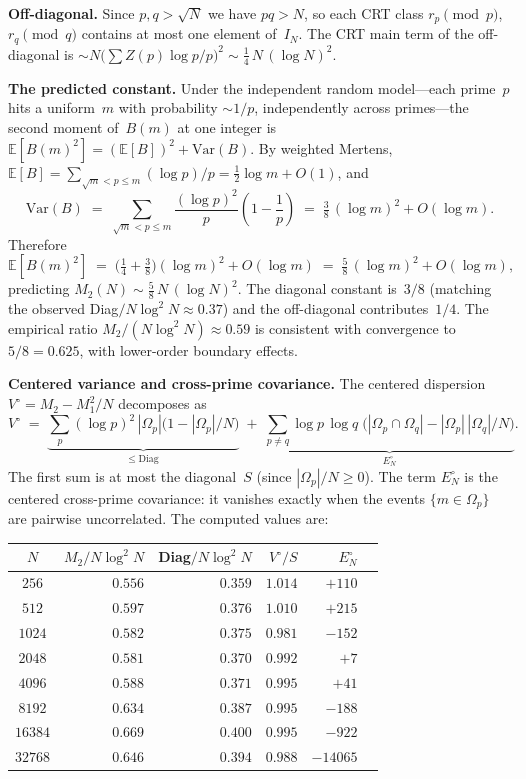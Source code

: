 \documentclass[11pt]{article}
\theoremstyle{definition}
\theoremstyle{remark}
\begin{document}
\textbf{Off-diagonal.}
Since $p, q > \sqrt{N}$ we have $pq > N$,
so each CRT class $r_p \pmod{p}$,
$r_q \pmod{q}$ contains at most one element
of~$I_N$.
The CRT main term of the off-diagonal is
$\sim N\bigl(\sum Z(p)\log p/p\bigr)^2
\sim \frac{1}{4}\,N\,(\log N)^2$.

\textbf{The predicted constant.}
Under the independent random model---each prime~$p$
hits a uniform~$m$ with probability $\sim 1/p$, independently
across primes---the second moment of~$B(m)$ at one
integer is $\mathbb{E}[B(m)^2] = (\mathbb{E}[B])^2
+ \mathrm{Var}(B)$.
By weighted Mertens,
$\mathbb{E}[B] = \sum_{\sqrt{m} < p \le m} (\log p)/p
= \frac{1}{2}\log m + O(1)$,
and
\[
  \mathrm{Var}(B) \;=\;
  \sum_{\sqrt{m} < p \le m}
  \frac{(\log p)^2}{p}\!\left(1 - \frac{1}{p}\right)
  \;=\; \tfrac{3}{8}\,(\log m)^2 + O(\log m).
\]
Therefore
\begin{equation}\label{eq:five-eighths}
  \mathbb{E}[B(m)^2] \;=\;
  \bigl(\tfrac{1}{4} + \tfrac{3}{8}\bigr)(\log m)^2
  + O(\log m)
  \;=\; \tfrac{5}{8}\,(\log m)^2 + O(\log m),
\end{equation}
predicting $M_2(N) \sim \frac{5}{8}\,N\,(\log N)^2$.
The diagonal constant is~$3/8$
(matching the observed Diag$/N\log^2 N \approx 0.37$)
and the off-diagonal contributes~$1/4$.
The empirical ratio $M_2/(N\log^2 N) \approx 0.59$
is consistent with convergence to~$5/8 = 0.625$,
with lower-order boundary effects.

\textbf{Centered variance and cross-prime covariance.}
The centered dispersion~$V^\circ = M_2 - M_1^2/N$
decomposes as
\begin{equation}\label{eq:variance-decomp}
  V^\circ \;=\;
  \underbrace{\sum_p (\log p)^2\,|\Omega_p|
  \bigl(1 - |\Omega_p|/N\bigr)}_{\le\;\text{Diag}}
  \;+\; \underbrace{\sum_{p \ne q} \log p\,\log q\;
  \bigl(|\Omega_p \cap \Omega_q|
  - |\Omega_p|\,|\Omega_q|/N\bigr)}_{E_N^\circ}.
\end{equation}
The first sum is at most the diagonal~$S$
(since $|\Omega_p|/N \ge 0$).
The term $E_N^\circ$ is the centered cross-prime
covariance: it vanishes exactly when the events
$\{m \in \Omega_p\}$ are pairwise uncorrelated.
The computed values are:
\begin{center}
\begin{tabular}{c|rrrrr}
$N$ & $M_2/N\!\log^2\!N$ & Diag$/N\!\log^2\!N$
  & $V^\circ/S$ & $E_N^\circ$ \\
\hline
$256$  & $0.556$ & $0.359$ & $1.014$ & $+110$ \\
$512$  & $0.597$ & $0.376$ & $1.010$ & $+215$ \\
$1024$ & $0.582$ & $0.375$ & $0.981$ & $-152$ \\
$2048$ & $0.581$ & $0.370$ & $0.992$ & $+7$ \\
$4096$ & $0.588$ & $0.371$ & $0.995$ & $+41$ \\
$8192$ & $0.634$ & $0.387$ & $0.995$ & $-188$ \\
$16384$ & $0.669$ & $0.400$ & $0.995$ & $-922$ \\
$32768$ & $0.646$ & $0.394$ & $0.988$ & $-14065$
\end{tabular}
\end{center}
\end{document}
